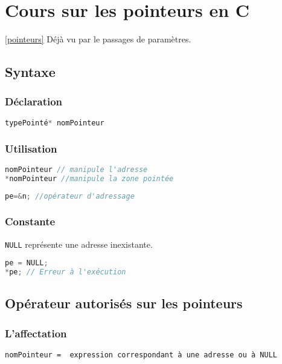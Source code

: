 \chapter{Cours sur les pointeurs en C}\ref{pointeurs}
Déjà vu par le passages de paramètres.
\section{Syntaxe}
	\subsection{Déclaration}
\begin{lstlisting}[language=C, numbers=none,frame=none]
typePointé* nomPointeur
\end{lstlisting}

	\subsection{Utilisation}
\begin{lstlisting}[language=C, numbers=none,frame=none]
nomPointeur // manipule l'adresse
*nomPointeur //manipule la zone pointée
\end{lstlisting}
\begin{lstlisting}[language=C, numbers=none,frame=none]
pe=&n; //opérateur d'adressage
\end{lstlisting}

\subsection{Constante}
	\texttt{NULL} représente une adresse inexistante.
	\begin{lstlisting}[language=C, numbers=none,frame=none]
pe = NULL;
*pe; // Erreur à l'exécution
	\end{lstlisting}

\section{Opérateur autorisés sur les pointeurs}
\subsection{L'affectation}
\begin{verbatim}
nomPointeur =  expression correspondant à une adresse ou à NULL
\end{verbatim}

